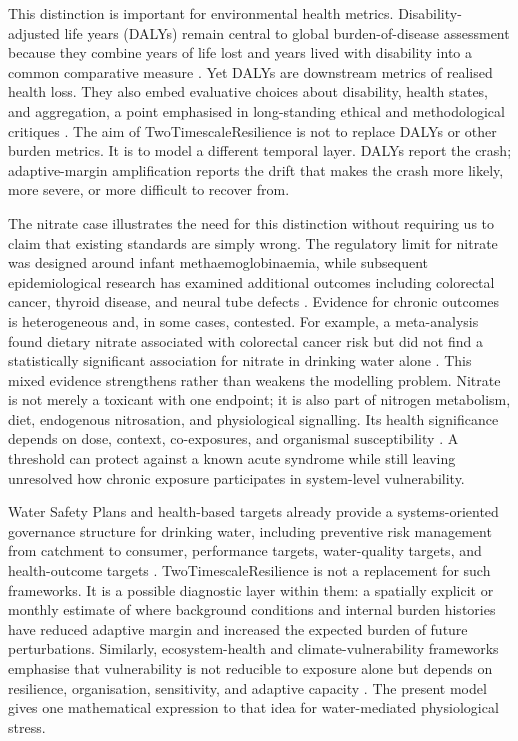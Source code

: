This distinction is important for environmental health metrics. Disability-adjusted life years (DALYs) remain central to global burden-of-disease assessment because they combine years of life lost and years lived with disability into a common comparative measure \citep{mathers2006burden}. Yet DALYs are downstream metrics of realised health loss. They also embed evaluative choices about disability, health states, and aggregation, a point emphasised in long-standing ethical and methodological critiques \citep{arnesen1999daly,solberg2020daly}. The aim of TwoTimescaleResilience is not to replace DALYs or other burden metrics. It is to model a different temporal layer. DALYs report the crash; adaptive-margin amplification reports the drift that makes the crash more likely, more severe, or more difficult to recover from.

The nitrate case illustrates the need for this distinction without requiring us to claim that existing standards are simply wrong. The regulatory limit for nitrate was designed around infant methaemoglobinaemia, while subsequent epidemiological research has examined additional outcomes including colorectal cancer, thyroid disease, and neural tube defects \citep{ward2018nitrate}. Evidence for chronic outcomes is heterogeneous and, in some cases, contested. For example, a meta-analysis found dietary nitrate associated with colorectal cancer risk but did not find a statistically significant association for nitrate in drinking water alone \citep{hosseini2021nitrate}. This mixed evidence strengthens rather than weakens the modelling problem. Nitrate is not merely a toxicant with one endpoint; it is also part of nitrogen metabolism, diet, endogenous nitrosation, and physiological signalling. Its health significance depends on dose, context, co-exposures, and organismal susceptibility \citep{ward2018nitrate}. A threshold can protect against a known acute syndrome while still leaving unresolved how chronic exposure participates in system-level vulnerability.

Water Safety Plans and health-based targets already provide a systems-oriented governance structure for drinking water, including preventive risk management from catchment to consumer, performance targets, water-quality targets, and health-outcome targets \citep{who2023wsp,who2022gdwq}. TwoTimescaleResilience is not a replacement for such frameworks. It is a possible diagnostic layer within them: a spatially explicit or monthly estimate of where background conditions and internal burden histories have reduced adaptive margin and increased the expected burden of future perturbations. Similarly, ecosystem-health and climate-vulnerability frameworks emphasise that vulnerability is not reducible to exposure alone but depends on resilience, organisation, sensitivity, and adaptive capacity \citep{rapport1998ecosystem,hyman2024ccva}. The present model gives one mathematical expression to that idea for water-mediated physiological stress.

